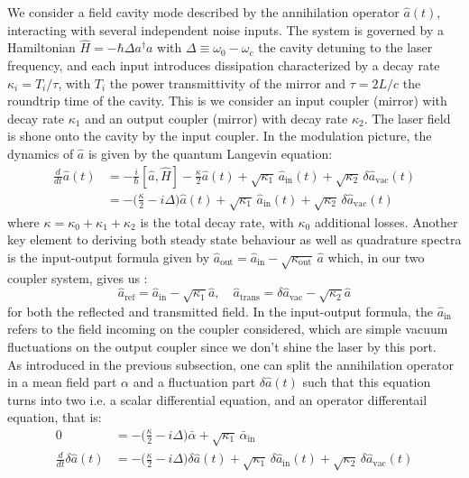 We consider a field cavity mode described by the annihilation operator \(\hat{a}(t)\), interacting with several independent noise inputs. The system is governed by a Hamiltonian \(\hat{H} = - \hbar \Delta  a^\dagger a \) with  $\Delta\equiv\omega_0 - \omega_c$ the cavity detuning to the laser frequency, and each input introduces dissipation characterized by a decay rate \(\kappa_i = T_i/\tau\), with $T_i$ the power transmittivity of the mirror and $\tau=2L/c$ the roundtrip time of the cavity. This is we consider an input coupler (mirror) with decay rate $\kappa_1$ and an output coupler (mirror) with decay rate $\kappa_2$. The laser field is shone onto the cavity by the input coupler. In the modulation picture, the dynamics of \(\hat{a}\) is given by the quantum Langevin equation:
%
\begin{equation}
\begin{split}
  \frac{d}{dt} \hat{a}(t) & = -\frac{i}{\hbar} [\hat{a}, \hat{H}] - \frac{\kappa}{2} \hat{a}(t) + \sqrt{\kappa_1} \, \hat{a}_{\mathrm{in}}(t)  + \sqrt{\kappa_2} \, \delta \hat{a}_{\mathrm{vac}}(t) \\
  & = -\Big(\frac{\kappa}{2}-i\Delta\Big) \hat{a}(t) + \sqrt{\kappa_{\mathrm{1}}} \, \hat{a}_{\mathrm{in}}(t)  + \sqrt{\kappa_2} \, \delta \hat{a}_{\mathrm{vac}}(t) 
\label{eq:qle}
\end{split}
\end{equation}
where  \(\kappa = \kappa_0 + \kappa_1 + \kappa_2\) is the total decay rate, with $\kappa_0$ additional losses. Another key element to deriving both steady state behaviour as well as quadrature spectra is the input-output formula given by $\hat{a}_{\mathrm{out}} = \hat{a}_{\mathrm{in}} - \sqrt{\kappa_{\mathrm{out}}} \, \hat{a}$ which, in our two coupler system, gives us :
\begin{equation}
  \hat{a}_{\mathrm{ref}} = \hat{a}_{\mathrm{in}} - \sqrt{\kappa_{1}}\hat{a} , \quad \hat{a}_{\mathrm{trans}} = \delta \hat{a}_{\mathrm{vac}} - \sqrt{\kappa_{2}}\hat{a} 
\end{equation}
for both the reflected and transmitted field. In the input-output formula, the $\hat{a}_{\mathrm{in}}$ refers to the field incoming on the coupler considered, which are simple vacuum fluctuations on the output coupler since we don't shine the laser by this port.\\
As introduced in the previous subsection, one can split the annihilation operator in a mean field part $\alpha$ and a fluctuation part $\delta \hat{a}(t)$ such that this equation turns into two i.e. a scalar differential equation, and an operator differentail equation, that is:
 \begin{equation}
  \begin{split}
  0 &= -\Big(\frac{\kappa}{2}-i\Delta\Big) \bar{\alpha} + \sqrt{\kappa_1} \, \bar{\alpha}_{\mathrm{in}} \\
  \frac{d}{dt} \delta\hat{a}(t) &= -\Big(\frac{\kappa}{2}-i\Delta\Big) \delta \hat{a}(t) + \sqrt{\kappa_{\mathrm{1}}} \, \delta \hat{a}_{\mathrm{in}}(t)  + \sqrt{\kappa_2} \, \delta \hat{a}_{\mathrm{vac}}(t) 
  \end{split}
\end{equation}

